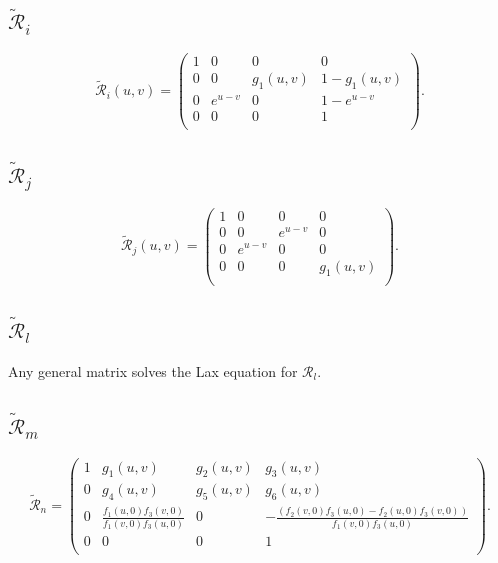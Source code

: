 \documentclass{article}
\begin{document}
\subsection{$\tilde{\mathcal{R}}_{i}$}
\begin{equation}
   \tilde{\mathcal{R}}_{i}(u,v)=
\begin{pmatrix} 
1& 0 & 0 & 0 \\
 0 & 0 &  g_1(u,v) & 1-g_1(u,v) \\
 0 & e^{u-v} & 0 & 1-e^{u-v}\\
 0 & 0 & 0 & 1\\
\end{pmatrix}.
\end{equation}

\subsection{$\tilde{\mathcal{R}}_{j}$}
\begin{equation}
   \tilde{\mathcal{R}}_{j}(u,v)=
\begin{pmatrix} 
1& 0 & 0 & 0 \\
 0 & 0 &  e^{u-v} & 0 \\
 0 & e^{u-v}& 0 & 0 \\
 0 & 0 & 0 & g_1(u,v) \\
\end{pmatrix}.
\end{equation}

\subsection{$\tilde{\mathcal{R}}_{l}$}
Any general matrix solves the Lax equation for $\mathcal{R}_l$.

\subsection{$\tilde{\mathcal{R}}_{m}$}
\begin{equation}
\tilde{\mathcal{R}}_{n}=
    \begin{pmatrix} 
1& g_1(u,v) & g_2(u,v) & g_3(u,v) \\
 0 & g_4(u,v)& g_5(u,v) & g_6(u,v) \\
 0 &\frac{f_1(u,0) f_3(v,0) }{f_1(v,0) f_3(u,0)} & 0 & -\frac{ ({f_2}(v,0) {f_3}(u,0)-{f_2}(u,0) {f_3}(v,0))}{{f_1}(v,0) {f_3}(u,0)} \\
 0 & 0 & 0 & 1\\
 \end{pmatrix}.
\end{equation}
\end{document}
